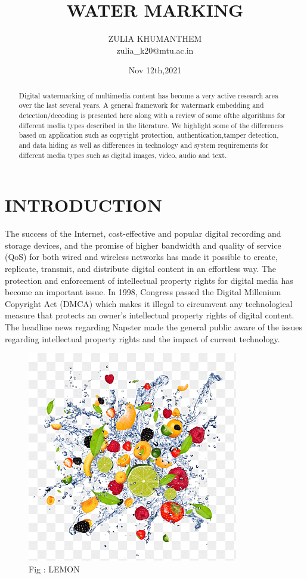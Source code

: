\documentclass[12pt]{IEeetran}
\title{\textbf{WATER MARKING}}
\author{ZULIA KHUMANTHEM\\zulia\_k20$@$mtu.ac.in}
\date{Nov 12th,2021}
\begin{document}
\begin{abstract}
Digital watermarking of multimedia content
has become a very active research area over
the last several years. A general framework
for watermark embedding and detection/decoding is presented here along with a review of some ofthe algorithms for different media types described in the literature. We highlight some of the differences based on application such as copyright protection, authentication,tamper detection, and data hiding as well as differences in technology and system requirements for different media types such as digital images, video, audio and text.
\end{abstract}
\section{INTRODUCTION}
 The success of the Internet, cost-effective and popular digital recording and storage devices, and the promise of
higher bandwidth and quality of service (QoS) for both
wired and wireless networks has made it possible to create,
replicate, transmit, and distribute digital content in an effortless way. The protection and enforcement of intellectual property rights for digital media has become an
important issue. In 1998, Congress passed the Digital
Millenium Copyright Act (DMCA) which makes it illegal
to circumvent any technological measure that protects an
owner’s intellectual property rights of digital content. The
headline news regarding Napster made the general public
aware of the issues regarding intellectual property rights
and the impact of current technology.
\centering
\begin{subfigure}{\linewidth}
\includegraphics[width=\linewidth]{lemon}
\caption{Fig : LEMON }
\end{subfigure}
\end{document}
